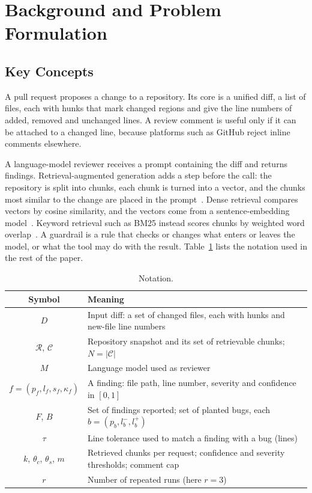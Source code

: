 \documentclass[12pt,onecolumn,draftclsnofoot]{IEEEtran}
\begin{document}
\section{Background and Problem Formulation}\label{sec:background}
\subsection{Key Concepts}
A pull request proposes a change to a repository. Its core is a unified diff, a list of files, each with hunks that mark changed regions and give the line numbers of added, removed and unchanged lines. A review comment is useful only if it can be attached to a changed line, because platforms such as GitHub reject inline comments elsewhere.

A language-model reviewer receives a prompt containing the diff and returns findings. Retrieval-augmented generation adds a step before the call: the repository is split into chunks, each chunk is turned into a vector, and the chunks most similar to the change are placed in the prompt~\cite{lewis2020rag,gao2023ragsurvey}. Dense retrieval compares vectors by cosine similarity, and the vectors come from a sentence-embedding model~\cite{reimers2019sbert}. Keyword retrieval such as BM25 instead scores chunks by weighted word overlap~\cite{robertson2009bm25}. A guardrail is a rule that checks or changes what enters or leaves the model, or what the tool may do with the result. Table~\ref{tab:notation} lists the notation used in the rest of the paper.

\begin{table}[!t]
\caption{Notation.}\label{tab:notation}
\centering\small
\begin{tabular}{@{}cp{4.6in}@{}}
\toprule
Symbol & Meaning \\
\midrule
$D$ & Input diff: a set of changed files, each with hunks and new-file line numbers \\
$\mathcal{R}$, $\mathcal{C}$ & Repository snapshot and its set of retrievable chunks; $N=|\mathcal{C}|$ \\
$M$ & Language model used as reviewer \\
$f=(p_f,l_f,s_f,\kappa_f)$ & A finding: file path, line number, severity and confidence in $[0,1]$ \\
$F$, $B$ & Set of findings reported; set of planted bugs, each $b=(p_b,l_b^-,l_b^+)$ \\
$\tau$ & Line tolerance used to match a finding with a bug (lines) \\
$k$, $\theta_c$, $\theta_s$, $m$ & Retrieved chunks per request; confidence and severity thresholds; comment cap \\
$r$ & Number of repeated runs (here $r=3$) \\
\bottomrule
\end{tabular}
\end{table}
\end{document}
